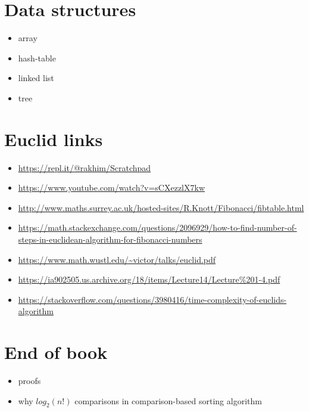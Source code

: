 \documentclass[a4paper, justified, notitlepage, sfsidenotes, notoc]{tufte-book}
\begin{document}
\chapter{Data structures}
\label{sec:orgedbcf1c}
\begin{itemize}
\item array
\item hash-table
\item linked list
\item tree
\end{itemize}

\chapter{Euclid links}
\label{sec:orgf4b5ddf}
\begin{itemize}
\item \url{https://repl.it/@rakhim/Scratchpad}
\item \url{https://www.youtube.com/watch?v=sCXezzlX7kw}
\item \url{http://www.maths.surrey.ac.uk/hosted-sites/R.Knott/Fibonacci/fibtable.html}
\item \url{https://math.stackexchange.com/questions/2096929/how-to-find-number-of-steps-in-euclidean-algorithm-for-fibonacci-numbers}
\item \url{https://www.math.wustl.edu/\~victor/talks/euclid.pdf}
\item \url{https://ia902505.us.archive.org/18/items/Lecture14/Lecture\%201-4.pdf}
\item \url{https://stackoverflow.com/questions/3980416/time-complexity-of-euclids-algorithm}
\end{itemize}

\chapter{End of book}
\label{sec:org65b24f9}
\begin{itemize}
\item proofs
\item why \(log_{2}(n!)\) comparisons in comparison-based sorting algorithm
\end{itemize}
\end{document}
